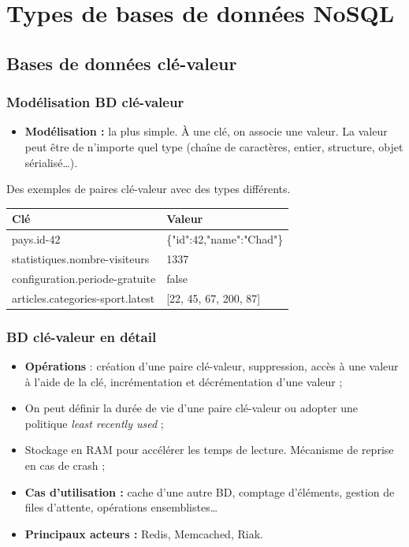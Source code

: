 \section{Types de bases de données NoSQL}

    \subsection{Bases de données clé-valeur}
    \begin{frame}
        \frametitle{Modélisation BD clé-valeur}

        \begin{itemize}
            \item \textbf{Modélisation :} la plus simple. À une clé, on associe une valeur. La valeur peut être de n'importe quel type (chaîne de caractères, entier, structure, objet sérialisé\dots).
        \end{itemize}

        \vspace{15px}
        Des exemples de paires clé-valeur avec des types différents.
        \vspace{5px}
        \begin{tabular}{|l|l|}
            \hline
            \textbf{Clé} & \textbf{Valeur} \\ \hline\hline
            pays.id-42 & \{"id":42,"name":"Chad"\} \\ \hline
            statistiques.nombre-visiteurs & 1337 \\ \hline
            configuration.periode-gratuite & false \\ \hline
            articles.categories-sport.latest & [22, 45, 67, 200, 87] \\ \hline
        \end{tabular}
    \end{frame}

    \begin{frame}
        \frametitle{BD clé-valeur en détail}
        \begin{itemize}
            \item \textbf{Opérations} : création d'une paire clé-valeur, suppression, accès à une valeur à l'aide de la clé, incrémentation et décrémentation d'une valeur ;
            \item On peut définir la durée de vie d'une paire clé-valeur ou adopter une politique \textit{least recently used} ;
            \item Stockage en RAM pour accélérer les temps de lecture. Mécanisme de reprise en cas de crash ;
            \item \textbf{Cas d'utilisation :} cache d'une autre BD, comptage d'éléments, gestion de files d'attente, opérations ensemblistes\dots
            \item \textbf{Principaux acteurs :} Redis, Memcached, Riak.
        \end{itemize}
    \end{frame}

